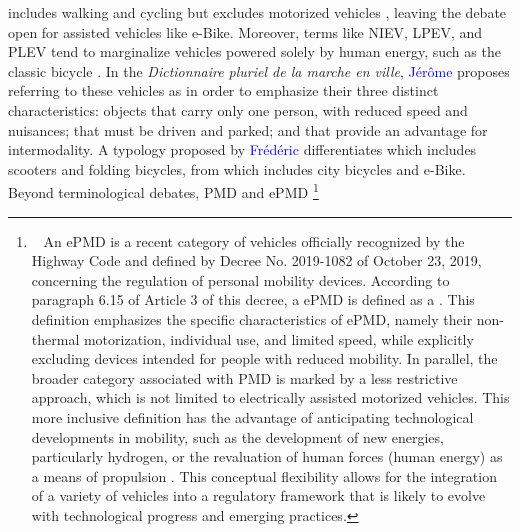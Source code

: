 \begin{refsegment}
{} includes walking and cycling but excludes motorized vehicles \textcolor{blue}{\autocite[555]{adam_mobilite_2020}}, leaving the debate open for assisted vehicles like \acrshort{e-Bike}. Moreover, terms like \acrfull{NIEV}, \acrfull{LPEV}, and \acrfull{PLEV} tend to marginalize vehicles powered solely by human energy, such as the classic bicycle \textcolor{blue}{\autocite[4]{pages_nouveaux_2021}}. In the \textsl{Dictionnaire pluriel de la marche en ville}, \textcolor{blue}{Jérôme} \textcolor{blue}{\textcite[233]{demailly_micro-vehicules_2021}} proposes referring to these vehicles as  in order to emphasize their three distinct characteristics: objects that carry only one person, with reduced speed and nuisances; that must be driven and parked; and that provide an advantage for intermodality. A typology proposed by \textcolor{blue}{Frédéric} \textcolor{blue}{\textcite[40]{heran_nouvelles_2018}} differentiates  which includes scooters and folding bicycles, from  which includes city bicycles and \acrshort{e-Bike}. Beyond terminological debates, \acrfull{PMD} and \acrfull{ePMD} \footnote{~
    An \acrfull{ePMD} is a recent category of vehicles officially recognized by the Highway Code and defined by Decree No. 2019-1082 of October 23, 2019, concerning the regulation of personal mobility devices. According to paragraph 6.15 of Article 3 of this decree, a \acrshort{ePMD} is defined as a  \textcolor{blue}{\autocite{legifrance_decret_2019}}. This definition emphasizes the specific characteristics of \acrshort{ePMD}, namely their non-thermal motorization, individual use, and limited speed, while explicitly excluding devices intended for people with reduced mobility. In parallel, the broader category associated with \acrfull{PMD} is marked by a less restrictive approach, which is not limited to electrically assisted motorized vehicles. This more inclusive definition has the advantage of anticipating technological developments in mobility, such as the development of new energies, particularly hydrogen, or the revaluation of human forces (human energy) as a means of propulsion \textcolor{blue}{\autocite{mobilityurban_quest-ce_2019}}. This conceptual flexibility allows for the integration of a variety of vehicles into a regulatory framework that is likely to evolve with technological progress and emerging practices.
}
\end{refsegment}
